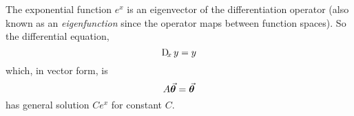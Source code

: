 \documentclass[MathsNotesBase.tex]{subfiles}
\begin{document}
{		The exponential function $e^x$ is an eigenvector of the differentiation operator (also known as an \textit{eigenfunction} since the operator maps between function spaces). So the differential equation,
		\begin{equation}
			\Dif_x y = y
		\end{equation}
		which, in vector form, is
		\begin{equation}
			A\vec{\bm{\theta}} = \vec{\bm{\theta}}
		\end{equation}
		has general solution $Ce^x$ for constant $C$.
	}
\end{document}
